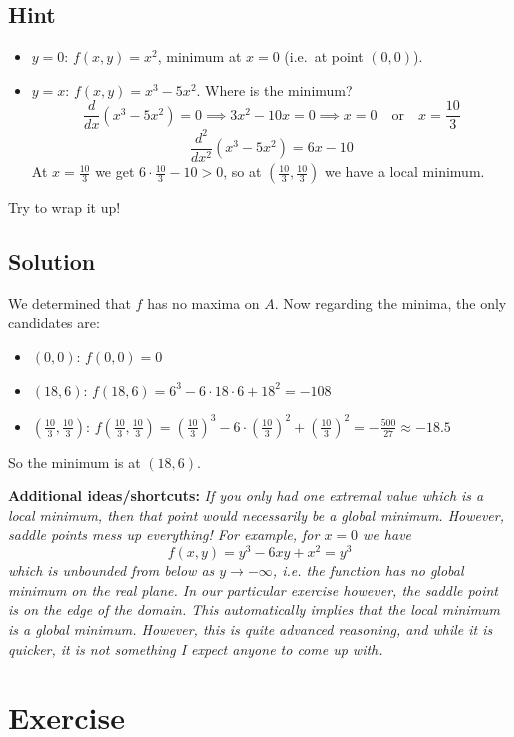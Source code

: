\documentclass[a4paper,10pt]{article}
\begin{document}
\subsection{Hint}
\begin{itemize}
    \item $y=0$: $f(x,y) = x^2$, minimum at $x=0$ (i.e.\ at point $(0,0)$).
    \item $y=x$: $f(x,y) = x^3 - 5x^2$. Where is the minimum?
          \[
              \frac{d}{dx}(x^3 - 5x^2) = 0 \implies 3x^2 - 10x = 0 \implies x = 0 \quad \mathrm{or} \quad x = \frac{10}{3}
          \]
          \[
              \frac{d^2}{dx^2}(x^3 - 5x^2) = 6x - 10
          \]
          At $x = \frac{10}{3}$ we get $6\cdot\frac{10}{3} - 10 > 0$, so at $\left(\frac{10}{3}, \frac{10}{3}\right)$ we have a local minimum.
\end{itemize}
Try to wrap it up!

\subsection{Solution}
We determined that $f$ has no maxima on $A$. Now regarding the minima, the only candidates are:
\begin{itemize}
    \item $(0,0)$: $f(0,0) = 0$
    \item $(18, 6)$: $f(18, 6) = 6^3 - 6\cdot 18\cdot 6 + 18^2 = - 108$
    \item $\left(\frac{10}{3}, \frac{10}{3}\right)$: $f\left(\frac{10}{3}, \frac{10}{3}\right) = \left(\frac{10}{3}\right)^3 - 6\cdot \left(\frac{10}{3}\right)^2 + \left(\frac{10}{3}\right)^2 = -\frac{500}{27} \approx -18.5$
\end{itemize}
So the minimum is at $(18, 6)$.

\textbf{Additional ideas/shortcuts:} \emph{If you only had one extremal value which is a local minimum, then that point would necessarily be a global minimum. However, saddle points mess up everything! For example, for $x=0$ we have \[f(x,y) = y^3 - 6xy + x^2 = y^3\] which is unbounded from below as $y\to-\infty$, i.e. the function has no global minimum on the real plane. In our particular exercise however, the saddle point is on the edge of the domain. This automatically implies that the local minimum is a global minimum. However, this is quite advanced reasoning, and while it is quicker, it is not something I expect anyone to come up with.}

\clearpage

\section{Exercise}
\end{document}
